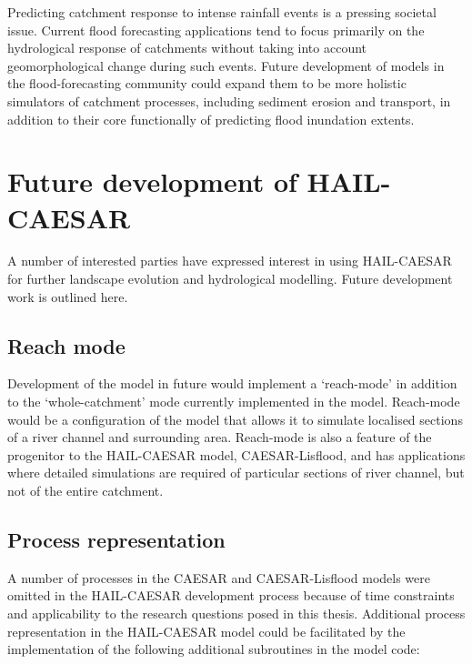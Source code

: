 Predicting catchment response to intense rainfall events is a pressing societal issue. Current flood forecasting applications tend to focus primarily on the hydrological response of catchments without taking into account geomorphological change during such events. Future development of models in the flood-forecasting community could expand them to be more holistic simulators of catchment processes, including sediment erosion and transport, in addition to their core functionally of predicting flood inundation extents. 

\section{Future development of HAIL-CAESAR}

A number of interested parties have expressed interest in using HAIL-CAESAR for further landscape evolution and hydrological modelling. Future development work is outlined here.

\subsection*{Reach mode}
Development of the model in future would implement a `reach-mode' in addition to the `whole-catchment' mode currently implemented in the model. Reach-mode would be a configuration of the model that allows it to simulate localised sections of a river channel and surrounding area. Reach-mode is also a feature of the progenitor to the HAIL-CAESAR model, CAESAR-Lisflood, and has applications where detailed simulations are required of particular sections of river channel, but not of the entire catchment.

\subsection*{Process representation}
A number of processes in the CAESAR and CAESAR-Lisflood models were omitted in the HAIL-CAESAR development process because of time constraints and applicability to the research questions posed in this thesis. Additional process representation in the HAIL-CAESAR model could be facilitated by the implementation of the following additional subroutines in the model code:

